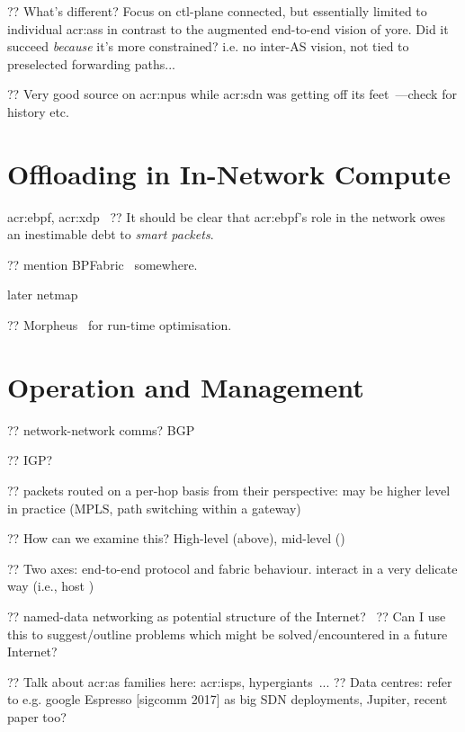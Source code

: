 ?? What's different? Focus on ctl-plane connected, but essentially limited to individual \glspl{acr:as} in contrast to the augmented end-to-end vision of yore. Did it succeed \emph{because} it's more constrained? i.e. no inter-AS vision, not tied to preselected forwarding paths...

?? Very good source on \glspl{acr:npu} while \gls{acr:sdn} was getting off its feet~\parencite{npu-book}---check for history etc.


\section{Offloading in In-Network Compute}

\gls{acr:ebpf}, \gls{acr:xdp}~\parencite{DBLP:conf/conext/Hoiland-Jorgensen18}
?? It should be clear that \gls{acr:ebpf}'s role in the network owes an inestimable debt to \emph{smart packets}.

?? mention BPFabric~\parencite{DBLP:conf/ancs/JouetP17} somewhere.

later netmap~\parencite{DBLP:conf/usenix/Rizzo12}

?? Morpheus~\parencite{miano-morpheus} for run-time optimisation.

\section{Operation and Management}

?? network-network comms? BGP

?? IGP?

?? packets routed on a per-hop basis from their perspective: may be higher level in practice (MPLS, path switching within a gateway)

?? How can we examine this? High-level (above), mid-level ()

?? Two axes: end-to-end protocol and fabric behaviour. interact in a very delicate way (i.e., host )

?? named-data networking as potential structure of the Internet?~\parencite{DBLP:journals/ccr/0001ABJcCPWZ14}
?? Can I use this to suggest/outline problems which might be solved/encountered in a future Internet?

?? Talk about \gls{acr:as} families here: \glspl{acr:isp}, hypergiants~\parencite{DBLP:conf/sigcomm/GigisCMNKDKS21}...
?? Data centres: refer to e.g. google Espresso [sigcomm 2017] as big SDN deployments, Jupiter, recent paper too?

